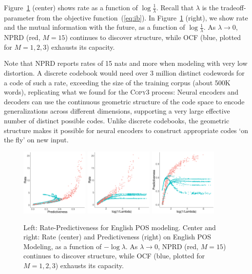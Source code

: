 \documentclass[entropy,article,submit,moreauthors,pdftex,10pt,a4paper]{Definitions/mdpi}
\newif \ifcomment
\newcommand\rljf[1]{\ifcomment{{\color{blue}(#1)}}\else{}\fi}
\begin{document}
Figure~\ref{fig:eng-pos} (center) shows rate as a function of $\log \frac{1}{\lambda}$.
Recall that $\lambda$ is the tradeoff-parameter from the objective function~(\ref{eq:ib}).
In Figure~\ref{fig:eng-pos} (right), we show rate and the mutual information with the future, as a function of $\log \frac{1}{\lambda}$.
As $\lambda \rightarrow 0$, NPRD (red, $M=15$) continues to discover structure, while OCF (blue, plotted for $M=1,2,3$) exhausts its capacity.

Note that NPRD reports rates of 15 nats and more when modeling with very low distortion.
A discrete codebook would need over 3 million distinct codewords for a code of such a rate, exceeding the size of the training corpus (about 500K words), replicating what we found for the \textsc{Copy3} process:
Neural encoders and decoders can use the continuous geometric structure of the code space to encode generalizations across different dimensions, supporting a very large effective number of distinct possible codes.
Unlike discrete codebooks, the geometric structure makes it possible for neural encoders to construct appropriate codes `on the fly' on new input.



\begin{figure}
\includegraphics[width=0.3\textwidth]{code/figures/english-info.pdf}
\includegraphics[width=0.3\textwidth]{code/figures/english-nlogbeta-mem.pdf}
\includegraphics[width=0.3\textwidth]{code/figures/english-nlogbeta-ee.pdf}
	\caption{Left: Rate-Predictiveness for English POS modeling. Center and right: Rate (center) and Predictiveness (right) on English POS Modeling, as a function of $-\log \lambda$. As $\lambda \rightarrow 0$, NPRD (red, $M=15$) continues to discover structure, while OCF (blue, plotted for $M=1,2,3$) exhausts its capacity. }\label{fig:eng-pos}
\end{figure}%
\end{document}
